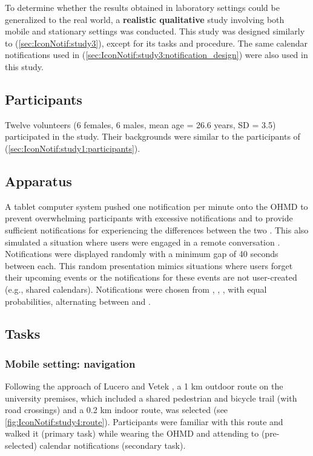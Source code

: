 To determine whether the results obtained in laboratory settings could be generalized to the real world, a \textbf{realistic qualitative} study involving both mobile and stationary settings was conducted. This study was designed similarly to \studythree{} (\autoref{sec:IconNotif:study3}), except for its tasks and procedure. The same calendar notifications used in \studythree{} (\autoref{sec:IconNotif:study3:notification_design}) were also used in this study.

\subsection{Participants}
\label{sec:IconNotif:study4:participants}

Twelve volunteers (6 females, 6 males, mean age = 26.6 years, SD = 3.5) participated in the study. Their backgrounds were similar to the participants of \studyone{} (\autoref{sec:IconNotif:study1:participants}). 

\subsection{Apparatus}

A tablet computer system pushed one notification per minute onto the OHMD to prevent overwhelming participants with excessive notifications and to provide sufficient notifications for experiencing the differences between the two . This also simulated a situation where users were engaged in a remote conversation \cite{avrahami_im_2008}. Notifications were displayed randomly with a minimum gap of 40 seconds between each. This random presentation mimics situations where users forget their upcoming events or the notifications for these events are not user-created (e.g., shared calendars). Notifications were chosen from \textsingle{}, \textmulti{}, \iconsingle{}, \iconmulti{} with equal probabilities, alternating between \textformat{} and \iconformat{}.


\subsection{Tasks}
\subsubsection*{Mobile setting: navigation}

Following the approach of Lucero and Vetek \cite{lucero_notifeye_2014}, a 1 km outdoor route on the university premises, which included a shared pedestrian and bicycle trail (with road crossings) and a 0.2 km indoor route, was selected (see \autoref{fig:IconNotif:study4:route}). Participants were familiar with this route and walked it (primary task) while wearing the OHMD and attending to (pre-selected) calendar notifications (secondary task).

